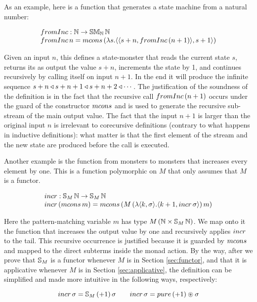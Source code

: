 As an example, here is a function that generates a state machine from a natural number:

$$
\begin{array}{l}
\frominc : \nat \rightarrow \stmon{\nat}\,\nat \\
\frominc\, n = \mcons\, (\lambda s. \pair{\pair{s+n}{\frominc\, (n + 1)}}{s + 1})
\end{array}
$$

Given an input $n$, this defines a state-monster that reads the current state $s$, returns its as output the value $s+n$, increments the state by 1, and continues recursively by calling itself on input $n+1$.
In the end it will produce the infinite sequence $s+n \triangleleft s+n+1 \triangleleft s+n+2 \triangleleft \cdots$.
The justification of the soundness of the definition is in the fact that the recursive call $\frominc\, (n + 1)$ occurs under the guard of the constructor $\mcons $ and is used to generate the recursive sub-stream of the main output value.
The fact that the input $n+1$ is larger than the original input $n$ is irrelevant to corecursive definitions (contrary to what happens in inductive definitions): what matter is that the first element of the stream and the new state are produced before the call is executed.

Another example is the function from monsters to monsters that increases every element by one.
This is a function polymorphic on $M$ that only assumes that $M$ is a functor.

$$
\begin{array}{l}
\incr : \stream{M}\,\nat \rightarrow \stream{M}\,\nat\\
\incr\,(\mcons\,m) = \mcons\,(M\,(\lambda \pair{k}{\sigma}. \pair{k+1}{\incr\,\sigma})\,m)
\end{array}
$$

Here the pattern-matching variable $m$ has type $M\,(\mathbb{N}\times \mathbb{S}_{M}\,\mathbb{N})$.
We map onto it the function that increases the output value by one and recursively applies $\incr$ to the tail.
This recursive occurrence is justified because it is guarded by $\mcons$ and mapped to the direct subterms inside the monad action.
By the way,
after we prove that $\mathbb{S}_{M}$ is a functor whenever $M$ is in Section \ref{sec:functor}, and that it is applicative whenever $M$ is in Section \ref{sec:applicative},
the definition can be simplified and made more intuitive in the following ways, respectively:

$$
\incr\,\sigma = \stream{M}\,(+1)\,\sigma
\qquad
\incr\,\sigma = \apure\,(+1) \appl \sigma
$$

